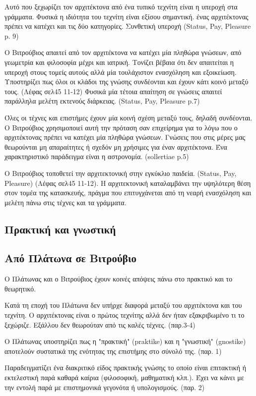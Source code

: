 Αυτό που ξεχωρίζει τον αρχιτέκτονα από ένα τυπικό τεχνίτη είναι η υπεροχή στα 
γράμματα. Φυσικά η ιδιότητα του τεχνίτη είναι εξίσου σημαντική. ένας 
αρχιτέκτονας πρέπει να κατέχει και τις δύο κατηγορίες. Συνθετική υπεροχή 
(Status, Pay, Pleasure p. 9)

Ο Βιτρούβιος απαιτεί από τον αρχιτέκτονα να κατέχει μία πληθώρα γνώσεων, από 
γεωμετρία και φιλοσοφία μέχρι και ιατρική. Τονίζει βέβαια ότι δεν απαιτείται η 
υπεροχή στους τομείς αυτούς αλλά μία τουλάχιστον ενασχόληση και εξοικείωση. 
Υποστηρίζει πως όλοι οι κλάδοι της γνώσης συνδέονται και έχουν κάτι κοινό 
μεταξύ τους. (Λέφας σελ45 11-12)
Φυσικά μία τέτοια απαίτηση σε γνώσεις απαιτεί παράλληλα μελέτη εκτενούς 
διάρκειας. (Status, Pay, Pleasure p.7)

Όλες οι τέχνες και επιστήμες έχουν μία κοινή σχέση μεταξύ τους, δηλαδή 
συνδέονται. Ο Βιτρούβιος χρησιμοποιεί αυτή την πρόταση σαν επιχείρημα για το 
λόγω που ο αρχιτέκτονας πρέπει να κατέχει μία πληθώρα γνώσεων. Γνώσεις που 
στις μέρες μας θεωρούνται μη απαραίτητες ή σχεδόν μη χρήσιμες για έναν 
αρχιτέκτονα. Ένα χαρακτηριστικό παράδειγμα είναι η αστρονομία. (sollertiae p.5)

Ο Βιτρούβιος τοποθετεί την αρχιτεκτονική στην εγκύκλιο παιδεία. (Status, Pay, 
Pleasure) (Λέφας σελ45 11-12). Η αρχιτεκτονική καταλαμβάνει την υψηλότερη θέση 
στον τομέα της κατασκευής, πράγμα που επιτυγχάνεται από τη νεαρή ενασχόληση και 
μελέτη πάνω στις τέχνες και τα γράμματα.

\subsection{Πρακτική και γνωστική}

\subsection{Από Πλάτωνα σε Βιτρούβιο}

Ο Πλάτωνας και ο Βιτρούβιος έχουν κοινές απόψεις πάνω στο πρακτικό και το
θεωρητικό.

Κατά τη εποχή του Πλάτωνα δεν υπήρχε διαφορά μεταξύ του αρχιτέκτονα και του 
τεχνίτη. Ο αρχιτέκτονας είναι ο πρώτος τεχνίτης αλλά δεν ήταν εξακριβωμένο τι 
το ξεχώριζε. Εξάλλου δεν θεωρούταν από τις καλές τέχνες. (παρ.3-4)

Ο Πλάτωνας υποστηρίζει πως η "πρακτική" (praktike) και η "γνωστική" (gnostike) 
αποτελούν συστατικά της ενότητας της επιστήμης στο σύνολό της. (παρ. 1)

Παραδειγματίζει ένα διακριτικό είδος πρακτικής γνώσης το οποίο είναι επιτακτική
ή εκτελεστική παρά καθαρά καίρια (φιλοσοφική, μαθηματική κλπ.). Έχει να κάνει με
την εντολή παρά με επιστημονικά γεγονότα ή υπολογισμούς. (παρ. 2)

